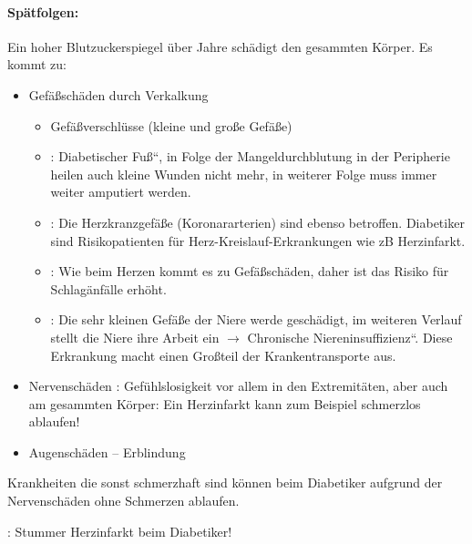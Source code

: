 \paragraph*{
Spätfolgen:}

Ein hoher Blutzuckerspiegel \"uber Jahre schädigt den gesammten
Körper. Es kommt zu:

\begin{itemize}
    \item {\mdseries
    Gefä{\ss}schäden durch Verkalkung}
    
    \begin{itemize}
        \item Gefä{\ss}verschl\"usse (kleine und gro{\ss}e Gefä{\ss}e)
        \item {}: {\quotedblbase}Diabetischer
        Fu{\ss}{\textquotedblleft}, in Folge der Mangeldurchblutung in der Peripherie heilen auch kleine
        Wunden nicht mehr, in weiterer Folge muss immer weiter amputiert
        werden.
        \item {}: Die Herzkranzgefä{\ss}e
        (Koronar\-arterien) sind ebenso betroffen. Diabetiker sind Risikopatienten f\"ur
        Herz-Kreislauf-Erkrankungen wie zB Herz\-infarkt.
        \item {}: Wie beim Herzen kommt es zu
        Gefä{\ss}schäden, daher ist das Risiko f\"ur Schlagänfälle erhöht.
        \item {}: Die sehr kleinen Gefä{\ss}e der
        Niere werde geschädigt, im weiteren Verlauf stellt die Niere ihre Arbeit ein
        ${\rightarrow}$ {\quotedblbase}Chronische
        Niereninsuffizienz{\textquotedblleft}. Diese Erkrankung macht einen
        Gro{\ss}teil der Krankentransporte aus.
    \end{itemize}
    \item {\mdseries
    Nervenschäden :
    Gef\"uhlslosigkeit vor allem in den Extremitäten, aber auch am
    gesammten Körper: Ein Herzinfarkt kann zum Beispiel schmerzlos
    ablaufen!}
    
    \item {\mdseries
    Augenschäden -- Erblindung}
    
\end{itemize}

Krankheiten die sonst schmerzhaft sind können beim Diabetiker aufgrund
der Nervenschäden ohne Schmerzen ablaufen. 

: Stummer Herzinfarkt beim Diabetiker!



